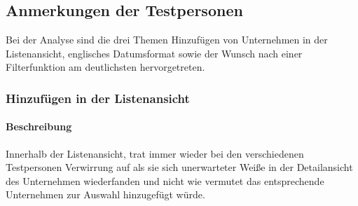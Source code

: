 \documentclass[Bachelorarbeit.tex]{subfiles}
\begin{document}
\subsection{Anmerkungen der Testpersonen}
Bei der Analyse sind die drei Themen Hinzufügen von Unternehmen in der Listenansicht, englisches Datumsformat sowie der Wunsch nach einer Filterfunktion am deutlichsten hervorgetreten.\\

\subsubsection*{Hinzufügen in der Listenansicht}
\paragraph{Beschreibung}
Innerhalb der Listenansicht, trat immer wieder bei den verschiedenen Testpersonen Verwirrung auf als sie sich unerwarteter Weiße in der Detailansicht des Unternehmen wiederfanden und nicht wie vermutet das entsprechende Unternehmen zur Auswahl hinzugefügt würde.
\end{document}
